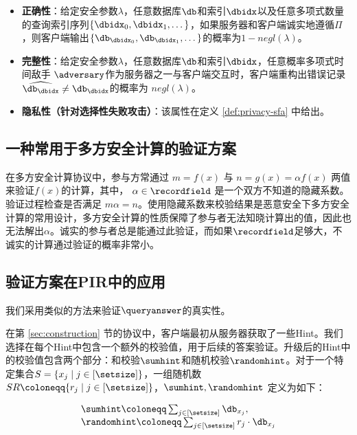 \begin{definition}
    \begin{itemize}
        \item \textbf{正确性}：给定安全参数$\lambda$，任意数据库$\db$和索引$\dbidx$以及任意多项式数量的查询索引序列$\{\dbidx_0,\dbidx_1, \dots\}$，如果服务器和客户端诚实地遵循$\Pi$，则客户端输出$\{\db_{\dbidx_0},\db_{\dbidx_1}, \dots\}$的概率为$1-negl(\lambda)$。
        \item \textbf{完整性}：给定安全参数$\lambda$，任意数据库$\db$和索引$\dbidx$，任意概率多项式时间敌手 $\adversary$作为服务器之一与客户端交互时，客户端重构出错误记录$\widehat{\db_\dbidx} \neq \db_\dbidx$的概率为 $negl(\lambda)$。
        \item \textbf{隐私性（针对选择性失败攻击）}：该属性在定义 \ref{def:privacy-sfa} 中给出。
    \end{itemize}
\end{definition}
\subsection{一种常用于多方安全计算的验证方案}
在多方安全计算协议中，参与方常通过 $m = f(x)$ 与 $n = g(x) = \alpha f(x)$ 两值来验证$f(x)$的计算，其中， $\alpha \in \recordfield$ 是一个双方不知道的隐藏系数。验证过程检查是否满足 $m\alpha = n$。使用隐藏系数来校验结果是恶意安全下多方安全计算的常用设计\cite{EC:BCGGIKR21,EC:CDFPW08,C:DPSZ12,EC:CasPol22}，多方安全计算的性质保障了参与者无法知晓计算出的值，因此也无法解出$\alpha$。诚实的参与者总是能通过此验证，而如果$\recordfield$足够大，不诚实的计算通过验证的概率非常小。

\subsection{验证方案在PIR中的应用}

我们采用类似的方法来验证$\queryanswer$的真实性。

在第 \ref{sec:construction} 节的协议中，客户端最初从服务器获取了一些Hint。我们选择在每个Hint中包含一个额外的校验值，用于后续的答案验证。升级后的Hint中的校验值包含两个部分：和校验$\sumhint$和随机校验$\randomhint$。对于一个特定集合$S = \{x_j \mid j\in [\setsize]\}$，一组随机数 $SR\coloneqq \{r_j \mid j\in [\setsize]\}$，$\sumhint, \randomhint$ 定义为如下：

$$
    \begin{array}{l}
        \sumhint \coloneqq  \sum_{j \in [\setsize]} \db_{x_j}, \\
        \randomhint \coloneqq  \sum_{j \in [\setsize]} r_j\cdot \db_{x_j}
    \end{array}
$$

